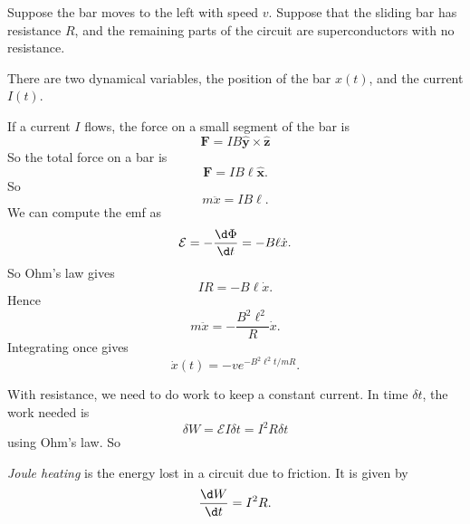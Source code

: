 \documentclass[a4paper]{article}
\begin{document}
\begin{eg}\leavevmode
  \begin{center}
  \end{center}
  Suppose the bar moves to the left with speed $v$. Suppose that the sliding bar has resistance $R$, and the remaining parts of the circuit are superconductors with no resistance.

  There are two dynamical variables, the position of the bar $x(t)$, and the current $I(t)$.

  If a current $I$ flows, the force on a small segment of the bar is
  \[
    \mathbf{F} = IB \hat{\mathbf{y}}\times \hat{\mathbf{z}}
  \]
  So the total force on a bar is
  \[
    \mathbf{F} = IB\ell\hat{\mathbf{x}}.
  \]
  So
  \[
    m\ddot{x} = IB\ell.
  \]
  We can compute the emf as
  \[
    \mathcal{E} = -\frac{\d \Phi}{\d t} = -B\ell\dot{x}.
  \]
  So Ohm's law gives
  \[
    IR = -B\ell\dot{x}.
  \]
  Hence
  \[
    m\ddot{x} = -\frac{B^2\ell^2}{R}\dot{x}.
  \]
  Integrating once gives
  \[
    \dot{x}(t) = -ve^{-B^2\ell^2t/mR}.
  \]
\end{eg}
With resistance, we need to do work to keep a constant current. In time $\delta t$, the work needed is
\[
  \delta W = \mathcal{E} I\delta t = I^2 R \delta t
\]
using Ohm's law. So
\begin{defi}
  \emph{Joule heating} is the energy lost in a circuit due to friction. It is given by
  \[
    \frac{\d W}{\d t} = I^2 R.
  \]
\end{defi}
\end{document}
